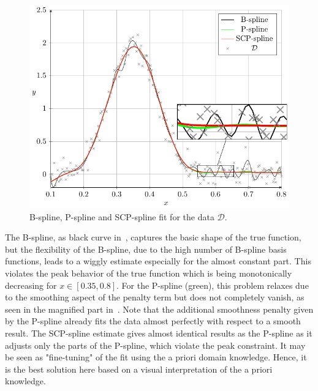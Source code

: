 \begin{figure}[H]
	\centering
	\includegraphics{graphics/pgfplots/cha4/exp-peak.pdf}
	\caption{B-spline, P-spline and SCP-spline fit for the data $\mathcal{D}$.}
	\label{fig:test-func-peak-fit}
\end{figure}
%
The B-spline, as black curve in~, captures the basic shape of the true function, but the flexibility of the B-spline, due to the high number of B-spline basis functions, leads to a wiggly estimate especially for the almost constant part. This violates the peak behavior of the true function which is being monotonically decreasing for $x \in [0.35, 0.8]$. For the P-spline (green), this problem relaxes due to the smoothing aspect of the penalty term but does not completely vanish, as seen in the magnified part in~. Note that the additional smoothness penalty given by the P-spline already fits the data almost perfectly with respect to a smooth result. The SCP-spline estimate gives almost identical results as the P-spline as it adjusts only the parts of the P-spline, which violate the peak constraint. It may be seen as "fine-tuning" of the fit using the a priori domain knowledge. Hence, it is the best solution here based on a visual interpretation of the a priori knowledge.

